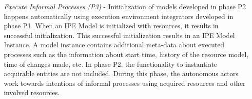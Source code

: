 \textit{Execute Informal Processes (P3)} - Initialization of models developed in phase P2 happens automatically using execution environment integrators developed in phase P1. When an IPE Model is initialized with resources, it results in successful initialization. This successful initialization results in an IPE Model Instance. A model instance contains additional meta-data about executed processes such as the information about start time, history of the resource model, time of changes made, etc. In phase P2, the functionality to instantiate acquirable entities are not included. During this phase, the autonomous actors work towards intentions of informal processes using acquired resources and other involved resources.  











